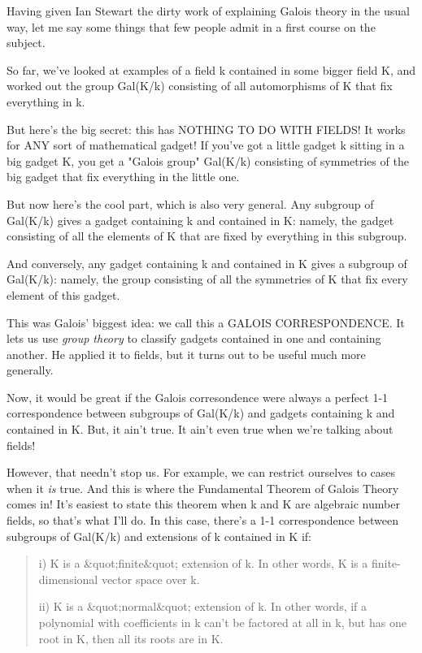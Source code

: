 Having given Ian Stewart the dirty work of explaining Galois theory in
the usual way, let me say some things that few people admit in a first
course on the subject.  

So far, we've looked at examples of a field k contained in some bigger
field K, and worked out the group Gal(K/k) consisting of all automorphisms 
of K that fix everything in k.  

But here's the big secret: this has NOTHING TO DO WITH FIELDS!  It works
for ANY sort of mathematical gadget!  If you've got a little gadget k 
sitting in a big gadget K, you get a "Galois group" Gal(K/k) consisting of 
symmetries of the big gadget that fix everything in the little one. 

But now here's the cool part, which is also very general.   Any subgroup 
of Gal(K/k) gives a gadget containing k and contained in K: namely, the 
gadget consisting of all the elements of K that are fixed by everything 
in this subgroup.

And conversely, any gadget containing k and contained in K gives a 
subgroup of Gal(K/k): namely, the group consisting of all the symmetries 
of K that fix every element of this gadget.  

This was Galois' biggest idea: we call this a GALOIS CORRESPONDENCE.
It lets us use \emph{group theory} to classify gadgets contained in one 
and containing another.  He applied it to fields, but it turns out 
to be useful much more generally.  

Now, it would be great if the Galois corresondence were always a perfect 
1-1 correspondence between subgroups of Gal(K/k) and gadgets containing
k and contained in K.  But, it ain't true.  It ain't even true when we're 
talking about fields!  

However, that needn't stop us.  For example, we can restrict ourselves 
to cases when it \emph{is} true.  
And this is where the Fundamental Theorem of 
Galois Theory comes in!  It's easiest to state this theorem when k and K 
are algebraic number fields, so that's what I'll do.  In this case, there's
a 1-1 correspondence between subgroups of Gal(K/k) and extensions of k 
contained in K if:

\begin{quote}
i) K is a &quot;finite&quot; extension of k.  In other words, K is a finite-dimensional
vector space over k.

ii) K is a &quot;normal&quot; extension of k.  In other words, if a 
polynomial with coefficients in k can't be factored at all in k, 
but has one root in K, then all its roots are in K.
\end{quote}
    


